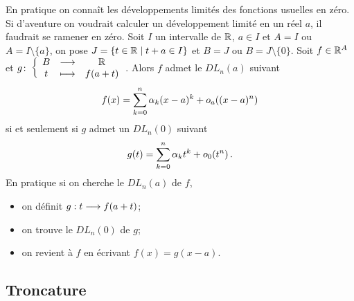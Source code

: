 En pratique on connaît les développements limités des fonctions usuelles en zéro. Si d'aventure on voudrait calculer un développement limité en un réel \(a\), il faudrait se ramener en zéro. Soit \(I\) un intervalle de \(\mathbb{R}\), \(a \in I\) et \(A=I\) ou \(A=I\setminus\{a\}\), on pose \(J=\left\{t \in \mathbb{R}\mathrel{}\middle|\mathrel{}t+a \in I\right\}\) et \(B=J\) ou \(B=J\setminus\{0\}\). Soit \(f \in \mathbb{R}^A\) et \(g\colon \left\{\begin{array}{ccc} B & \longrightarrow &\mathbb{R}\\ t & \longmapsto & f(a+t) \end{array} \right.\). Alors \(f\) admet le \(DL_n(a)\) suivant
\begin{equation}
  f(x)=\sum_{k=0}^n \alpha_k (x-a)^k +o\mathopen{}_{a}\left((x-a)^n\right)
\end{equation}
si et seulement si \(g\) admet un \(DL_n(0)\) suivant
\begin{equation}
  g(t)=\sum_{k=0}^n \alpha_k t^k +o\mathopen{}_{0}\left(t^n\right).
\end{equation}
En pratique si on cherche le \(DL_n(a)\) de \(f\),
\begin{itemize}
\item on définit \(g:t \longrightarrow f(a+t)\);
\item on trouve le \(DL_n(0)\) de \(g\);
\item on revient à \(f\) en écrivant \(f(x)=g(x-a)\).
\end{itemize}

\subsection{Troncature}

